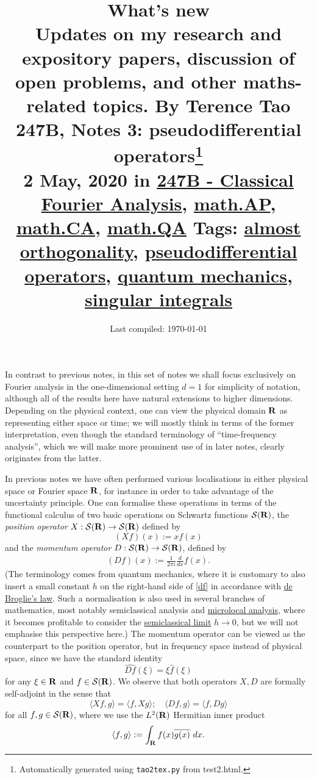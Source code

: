 \documentclass[11pt]{article}
\title{{\normalsize What's new\\Updates on my research and expository papers, discussion of open problems, and other maths-related topics.  By Terence Tao}\\247B, Notes 3: pseudodifferential operators\footnote{Automatically generated using \texttt{tao2tex.py} from test2.html.}\\ \footnotesize 2 May, 2020 in \href{https://terrytao.wordpress.com/category/teaching/247b-classical-fourier-analysis/}{247B - Classical Fourier Analysis}, \href{https://terrytao.wordpress.com/category/mathematics/mathap/}{math.AP}, \href{https://terrytao.wordpress.com/category/mathematics/mathca/}{math.CA}, \href{https://terrytao.wordpress.com/category/mathematics/mathqa/}{math.QA} \textbar Tags: \href{https://terrytao.wordpress.com/tag/almost-orthogonality/}{almost orthogonality}, \href{https://terrytao.wordpress.com/tag/pseudodifferential-operators/}{pseudodifferential operators}, \href{https://terrytao.wordpress.com/tag/quantum-mechanics/}{quantum mechanics}, \href{https://terrytao.wordpress.com/tag/singular-integrals/}{singular integrals} }
\author{}
\date{Last compiled: \today}
\theoremstyle{definition}
\theoremstyle{remark}
\begin{document}
\maketitle

 In contrast to previous notes, in this set of notes we shall focus exclusively on Fourier analysis in the one-dimensional setting \({d=1}\) for simplicity of notation, although all of the results here have natural extensions to higher dimensions. Depending on the physical context, one can view the physical domain \({{\bf R}}\) as representing either space or time; we will mostly think in terms of the former interpretation, even though the standard terminology of “time-frequency analysis”, which we will make more prominent use of in later notes, clearly originates from the latter.


In previous notes we have often performed various localisations in either physical space or Fourier space \({{\bf R}}\), for instance in order to take advantage of the uncertainty principle. One can formalise these operations in terms of the functional calculus of two basic operations on Schwartz functions \({{\mathcal S}({\bf R})}\), the \emph{position operator} \({X: {\mathcal S}({\bf R}) \rightarrow {\mathcal S}({\bf R})}\) defined by 
\[\displaystyle  (Xf)(x) := x f(x)\]
 and the \emph{momentum operator} \({D: {\mathcal S}({\bf R}) \rightarrow {\mathcal S}({\bf R})}\), defined by 
\begin{align}\label{df}
  (Df)(x) := \frac{1}{2\pi i} \frac{d}{dx} f(x). 
\end{align}
 (The terminology comes from quantum mechanics, where it is customary to also insert a small constant \({h}\) on the right-hand side of \eqref{df} in accordance with \href{https://en.wikipedia.org/wiki/Matter_wave}{de Broglie’s law}. Such a normalisation is also used in several branches of mathematics, most notably semiclassical analysis and \href{https://en.wikipedia.org/wiki/Microlocal_analysis}{microlocal analysis}, where it becomes profitable to consider the \href{https://en.wikipedia.org/wiki/Semiclassical_physics}{semiclassical limit} \({h \rightarrow 0}\), but we will not emphasise this perspective here.) The momentum operator can be viewed as the counterpart to the position operator, but in frequency space instead of physical space, since we have the standard identity 
\[\displaystyle  \widehat{Df}(\xi) = \xi \hat f(\xi)\]
 for any \({\xi \in {\bf R}}\) and \({f \in {\mathcal S}({\bf R})}\). We observe that both operators \({X,D}\) are formally self-adjoint in the sense that 
\[\displaystyle  \langle Xf, g \rangle = \langle f, Xg \rangle; \quad \langle Df, g \rangle = \langle f, Dg \rangle\]
 for all \({f,g \in {\mathcal S}({\bf R})}\), where we use the \({L^2({\bf R})}\) Hermitian inner product 
\[\displaystyle  \langle f, g\rangle := \int_{\bf R} f(x) \overline{g(x)}\ dx.\]
\end{document}
